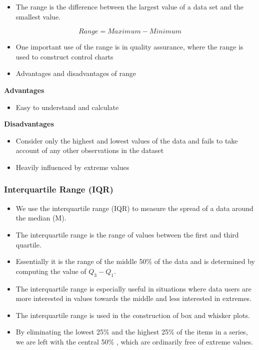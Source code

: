 \documentclass[]{book}
\providecommand{\tightlist}{%
  \setlength{\itemsep}{0pt}\setlength{\parskip}{0pt}}
\begin{document}
\begin{itemize}
\tightlist
\item
  The range is the difference between the largest value of a data set and the smallest value.
\end{itemize}

\[Range = Maximum - Minimum\]

\begin{itemize}
\item
  One important use of the range is in quality assurance, where the range is used to construct control charts
\item
  Advantages and disadvantages of range
\end{itemize}

\textbf{Advantages}

\begin{itemize}
\tightlist
\item
  Easy to understand and calculate
\end{itemize}

\textbf{Disadvantages}

\begin{itemize}
\tightlist
\item
  Consider only the highest and lowest values of the data and fails to take account of any other observations in the dataset
\item
  Heavily influenced by extreme values
\end{itemize}

\hypertarget{interquartile-range-iqr}{%
\subsubsection{Interquartile Range (IQR)}\label{interquartile-range-iqr}}

\begin{itemize}
\item
  We use the interquartile range (IQR) to measure the spread of a data around the median (M).
\item
  The interquartile range is the range of values between the first and third quartile.
\item
  Essentially it is the range of the middle 50\% of the data and is determined by computing the value of \(Q_3 - Q_1\).
\item
  The interquartile range is especially useful in situations where data users are more interested in values towards the middle and less interested in extremes.
\item
  The interquartile range is used in the construction of box and whisker plots.
\item
  By eliminating the lowest 25\% and the highest 25\% of the items in a series, we are left with the central 50\% , which are ordinarily free of extreme values.
\end{itemize}
\end{document}
